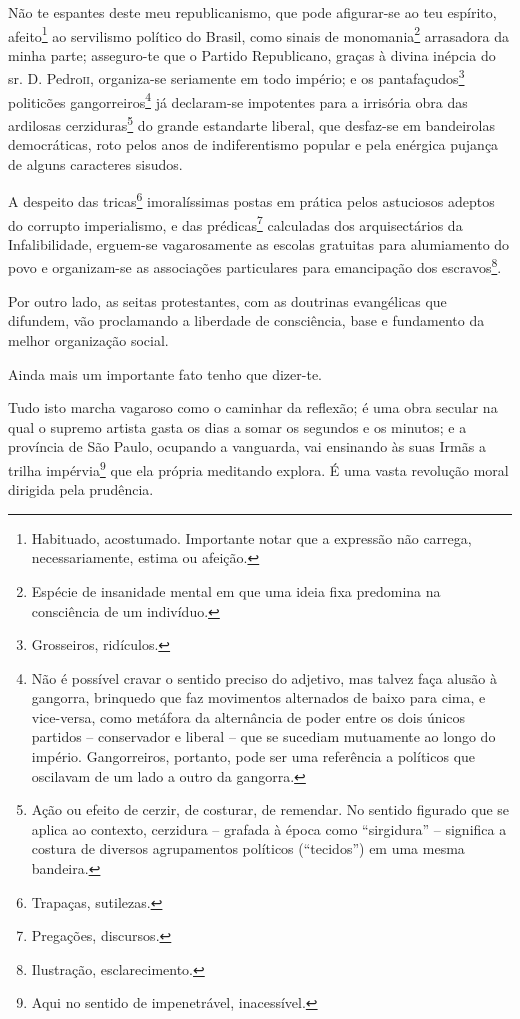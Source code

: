 {Não te espantes deste meu republicanismo, que pode afigurar-se ao teu
espírito, afeito\footnote{ Habituado, acostumado. Importante notar que
  a expressão não carrega, necessariamente, estima ou afeição.} ao
servilismo político do Brasil, como sinais de {monomania}\footnote{
  Espécie de insanidade mental em que uma ideia fixa predomina na
  consciência de um indivíduo.} {arrasadora} da minha parte; asseguro-te
que o Partido Republicano, graças à divina inépcia do sr. D. Pedro\textsc{ii},
organiza-se seriamente em todo império; e os pantafaçudos\footnote{
  Grosseiros, ridículos.} politicões gangorreiros\footnote{ Não é
  possível cravar o sentido preciso do adjetivo, mas talvez faça alusão
  à gangorra, brinquedo que faz movimentos alternados de baixo para
  cima, e vice-versa, como metáfora da alternância de poder entre os
  dois únicos partidos -- conservador e liberal -- que se sucediam
  mutuamente ao longo do império. Gangorreiros, portanto, pode ser uma
  referência a políticos que oscilavam de um lado a outro da gangorra.}
já declaram-se impotentes para a irrisória obra das ardilosas
cerziduras\footnote{ Ação ou efeito de cerzir, de costurar, de
  remendar. No sentido figurado que se aplica ao contexto, cerzidura --
  grafada à época como ``sirgidura'' -- significa a costura de diversos
  agrupamentos políticos (``tecidos'') em uma mesma bandeira.} do g{rande
estandarte liberal}, que desfaz-se em bandeirolas democráticas, roto
pelos anos de indiferentismo popular e pela enérgica pujança de alguns
caracteres sisudos.

A despeito das tricas\footnote{ Trapaças, sutilezas.} imoralíssimas
postas em prática pelos astuciosos adeptos do corrupto imperialismo, e
das prédicas\footnote{ Pregações, discursos.} calculadas dos
arquisectários da {Infalibilidade}, erguem-se vagarosamente as escolas
gratuitas para alumiamento do povo e organizam-se as associações
particulares para emancipação dos escravos\footnote{ Ilustração,
  esclarecimento.}.

Por outro lado, as seitas protestantes, com as doutrinas evangélicas que
difundem, vão proclamando a liberdade de consciência, base e fundamento
da melhor organização social.

Ainda mais um importante fato tenho que dizer-te.

Tudo isto marcha vagaroso como o caminhar da reflexão; é uma obra
secular na qual o {supremo artista} gasta os dias a somar os segundos e
os minutos; e a província de São Paulo, ocupando a vanguarda, vai
ensinando às suas Irmãs a trilha impérvia\footnote{ Aqui no sentido de
  impenetrável, inacessível.} que ela própria meditando explora. É uma
vasta revolução moral dirigida pela prudência.

}
